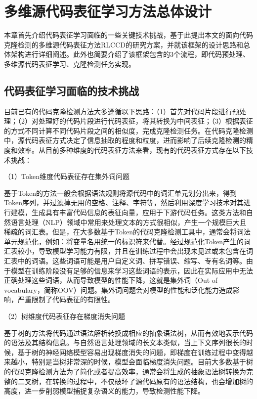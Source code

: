 \chapter{多维源代码表征学习方法总体设计}
\label{chap:design}

本章首先介绍代码表征学习面临的一些关键技术挑战，基于此提出本文的面向代码克隆检测的多维源代码表征方法RLCCD的研究方案，并就该框架的设计思路和总体架构进行详细阐述。此外也简要介绍了该框架包含的3个流程，即代码预处理、多维源代码表征学习、克隆检测任务实现。

\section{代码表征学习面临的技术挑战}
\label{sec:challenges}

目前已有的代码克隆检测方法大多遵循以下思路：（1）首先对代码片段进行预处理；（2）对处理好的代码片段进行代码表征，将其转换为中间表征；（3）根据表征的方式不同计算不同代码片段之间的相似度，完成克隆检测任务。在代码克隆检测中，源代码表征方式决定了信息抽取的程度和粒度，进而影响了后续克隆检测的精度和效率。从目前多种维度的代码表征方法来看，现有的代码表征方式存在以下技术挑战：

（1）Token维度代码表征存在集外词问题

基于Token的方法一般会根据语法规则将源代码中的词汇单元划分出来，得到Token序列，并过滤掉无用的空格、注释、字符等，然后利用深度学习技术对其进行建模，生成具有丰富代码信息的表征向量，应用于下游代码任务。这类方法和自然语言处理（NLP）领域中常用来处理文本的方式很相似，产生一个规模巨大且稀疏的词汇表。但是，在大多数基于Token的代码克隆检测工具中，通常会将词法单元规范化，例如：将变量名用统一的标识符来代替。经过规范化Token产生的词汇表较小，导致模型学习能力有限，并且在训练过程中会出现未见过或未包含在词汇表中的词语。这些词语可能是用户自定义词、拼写错误、缩写、专有名词等。由于模型在训练阶段没有足够的信息来学习这些词语的表示，因此在实际应用中无法正确处理这些词语，从而导致模型的性能下降，这就是集外词（Out of vocabulary，简称OOV）问题。集外词问题会对模型的性能和泛化能力造成影响，严重限制了代码表征的有限性。

（2）树维度代码表征存在梯度消失问题

基于树的方法将代码通过语法解析转换成相应的抽象语法树，从而有效地表示代码的语法及其结构信息。与自然语言处理领域的长文本类似，当上下文序列很长的时候，基于树的神经网络模型容易出现梯度消失的问题，即梯度在训练过程中变得越来越小，特别是当树非常深的时候，模型会面临梯度消失问题。目前大多数基于树的代码克隆检测方法为了简化或者提高效率，通常会将生成的抽象语法树转换为完整的二叉树，在转换的过程中，不仅破坏了源代码原有的语法结构，也会增加树的高度，进一步削弱模型捕捉复杂语义的能力，导致检测性能下降。

